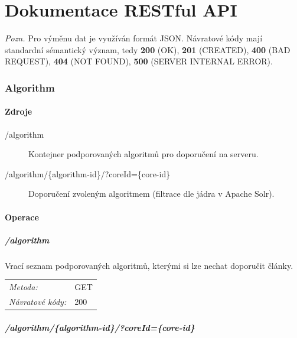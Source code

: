 \documentclass[thesis=M,czech]{FITthesis}[2014/05/07]
\begin{document}



\appendix

\chapter{Dokumentace RESTful API}
\label{restfulapi}

\emph{Pozn.} Pro výměnu dat je využíván formát JSON. Návratové kódy mají standardní sémantický význam, tedy \textbf{200} (OK), \textbf{201} (CREATED), \textbf{400} (BAD REQUEST), \textbf{404} (NOT FOUND), \textbf{500} (SERVER INTERNAL ERROR).

\subsection{Algorithm}

\subsubsection{Zdroje}

\begin{description}
	\item[/algorithm] Kontejner podporovaných algoritmů pro doporučení na serveru.
	\item[/algorithm/\{algorithm-id\}/?coreId=\{core-id\}] Doporučení zvoleným algoritmem (filtrace dle jádra v Apache Solr).
\end{description}

\subsubsection{Operace}

\paragraph*{/algorithm}

Vrací seznam podporovaných algoritmů, kterými si lze nechat doporučit články.

\begin{center}
 	\begin{tabular}{lp{10cm}}
 		\textit{Metoda:}		& GET			\tabularnewline 
 		\textit{Návratové kódy:}		& 200			\tabularnewline 		
 	\end{tabular}
\end{center} 	

\paragraph*{/algorithm/\{algorithm-id\}/?coreId=\{core-id\}}
\end{document}
